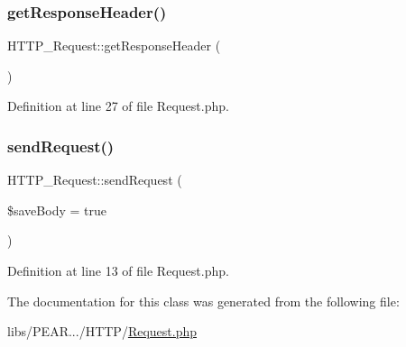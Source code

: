 \subsubsection{\texorpdfstring{get\+Response\+Header()}{getResponseHeader()}}
{\footnotesize\ttfamily H\+T\+T\+P\+\_\+\+Request\+::get\+Response\+Header (\begin{DoxyParamCaption}{ }\end{DoxyParamCaption})}



Definition at line 27 of file Request.\+php.

\hypertarget{classHTTP__Request_af3e8b1423f6a2858652063c4a6f697a0}{}\label{classHTTP__Request_af3e8b1423f6a2858652063c4a6f697a0} 
\subsubsection{\texorpdfstring{send\+Request()}{sendRequest()}}
{\footnotesize\ttfamily H\+T\+T\+P\+\_\+\+Request\+::send\+Request (\begin{DoxyParamCaption}\item[{}]{\$save\+Body = {\ttfamily true} }\end{DoxyParamCaption})}



Definition at line 13 of file Request.\+php.



The documentation for this class was generated from the following file\+:\begin{DoxyCompactItemize}
\item 
libs/\+P\+E\+A\+R.../\+H\+T\+T\+P/\hyperlink{Request_8php}{Request.\+php}\end{DoxyCompactItemize}
